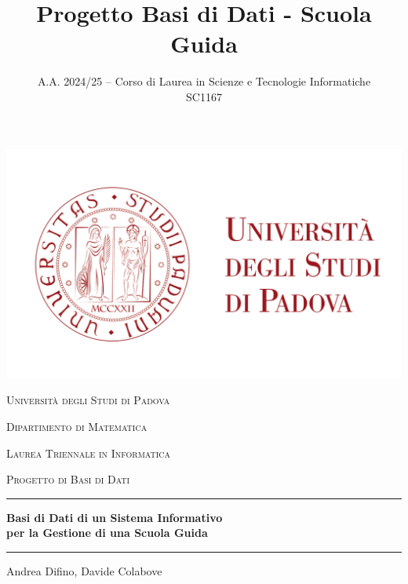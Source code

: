 \documentclass[10pt,twoside]{article}
\begin{document}
\begin{titlepage}
    \centering
    \includegraphics{logo.png}\par\vspace{1cm}
    {\scshape\Large Università degli Studi di Padova \par}
    \vspace{1.5cm}
    {\scshape\large Dipartimento di Matematica\par}
    \vspace{0.5cm}
    {\scshape\large Laurea Triennale in Informatica\par}
    \vspace{2cm}
    {\scshape\Large Progetto di Basi di Dati\\\par}
    \vspace{1cm}
    \hrule
    \vspace{1cm}
    {\large\bfseries
    Basi di Dati di un Sistema Informativo\\
    per la Gestione di una Scuola Guida\par}
    \vspace{1cm}
    \hrule
    \vfill
    {\large Andrea Difino, Davide Colabove\par}
\end{titlepage}

\pagestyle{fancy}
\fancyhead{}
\title{Progetto Basi di Dati - Scuola Guida}
\date{A.A. 2024/25 -- Corso di Laurea in Scienze e Tecnologie Informatiche\\SC1167}
\maketitle
\end{document}
